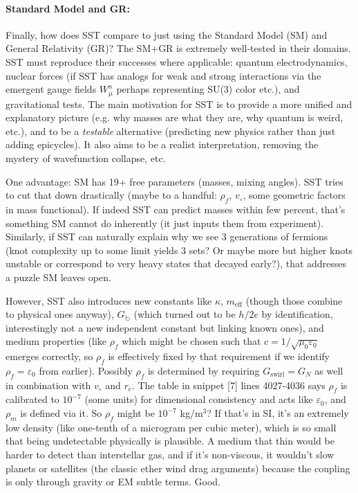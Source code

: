 \documentclass[10pt,reprint,aps,onecolumn,nofootinbib]{revtex4-2}
\newcommand{\rc}{r_c}                                    %
\providecommand{\rc}{r_c}
\newcommand{\rhoF}{\rho_{\!f}}     %
\newcommand{\rhoM}{\rho_{\!m}}     %
\begin{document}
\paragraph{Standard Model and GR:}

Finally, how does SST compare to just using the Standard Model (SM) and General Relativity (GR)? The SM+GR is extremely well-tested in their domains. SST must reproduce their successes where applicable: quantum electrodynamics, nuclear forces (if SST has analogs for weak and strong interactions via the emergent gauge fields $W_\mu^a$ perhaps representing SU(3) color etc.), and gravitational tests. The main motivation for SST is to provide a more unified and explanatory picture (e.g. why masses are what they are, why quantum is weird, etc.), and to be a \emph{testable} alternative (predicting new physics rather than just adding epicycles). It also aims to be a realist interpretation, removing the mystery of wavefunction collapse, etc.


One advantage: SM has 19+ free parameters (masses, mixing angles). SST tries to cut that down drastically (maybe to a handful: $\rhoF$, $v_{\circ}$, some geometric factors in mass functional). If indeed SST can predict masses within few percent, that’s something SM cannot do inherently (it just inputs them from experiment). Similarly, if SST can naturally explain why we see 3 generations of fermions (knot complexity up to some limit yields 3 sets? Or maybe more but higher knots unstable or correspond to very heavy states that decayed early?), that addresses a puzzle SM leaves open.


However, SST also introduces new constants like $\kappa$, $m_{\mathrm{eff}}$ (though those combine to physical ones anyway), $G_{\circlearrowright}$ (which turned out to be $h/2e$ by identification, interestingly not a new independent constant but linking known ones), and medium properties (like $\rhoF$ which might be chosen such that $c = 1/\sqrt{\mu_0 \varepsilon_0}$ emerges correctly, so $\rhoF$ is effectively fixed by that requirement if we identify $\rhoF = \varepsilon_0$ from earlier). Possibly $\rhoF$ is determined by requiring $G_{\text{swirl}} = G_N$ as well in combination with $v_{\circ}$ and $\rc$. The table in snippet [7] lines 4027-4036 says $\rhoF$ is calibrated to $10^{-7}$ (some units) for dimensional consistency and acts like $\varepsilon_0$, and $\rhoM$ is defined via it. So $\rhoF$ might be $10^{-7}$ kg/m$^3$? If that’s in SI, it’s an extremely low density (like one-tenth of a microgram per cubic meter), which is so small that being undetectable physically is plausible. A medium that thin would be harder to detect than interstellar gas, and if it's non-viscous, it wouldn’t slow planets or satellites (the classic ether wind drag arguments) because the coupling is only through gravity or EM subtle terms. Good.
\end{document}
